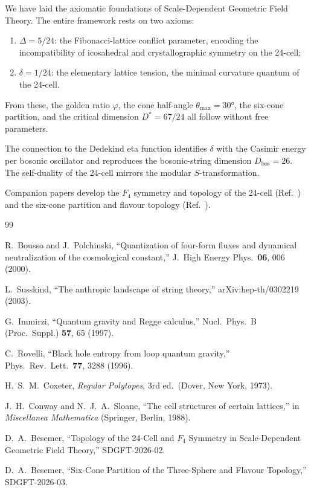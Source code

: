 \documentclass[amsmath,amssymb,aps,prd,twocolumn,superscriptaddress,nofootinbib]{revtex4-2}
\begin{document}
We have laid the axiomatic foundations of Scale-Dependent Geometric Field
Theory.  The entire framework rests on two axioms:
\begin{enumerate}
  \item $\Delta = 5/24$: the Fibonacci-lattice conflict parameter, encoding the
    incompatibility of icosahedral and crystallographic symmetry on the 24-cell;
  \item $\delta = 1/24$: the elementary lattice tension, the minimal curvature
    quantum of the 24-cell.
\end{enumerate}
From these, the golden ratio $\varphi$, the cone half-angle $\theta_{\max} =
30°$, the six-cone partition, and the critical dimension $D^* = 67/24$ all
follow without free parameters.

The connection to the Dedekind eta function identifies $\delta$ with the
Casimir energy per bosonic oscillator and reproduces the bosonic-string
dimension $D_{\text{bos}} = 26$.  The self-duality of the 24-cell mirrors the
modular $S$-transformation.

Companion papers develop the $F_4$ symmetry and topology of the 24-cell
(Ref.~\cite{Besemer2026_02}) and the six-cone partition and flavour topology
(Ref.~\cite{Besemer2026_03}).

\begin{thebibliography}{99}

R.~Bousso and J.~Polchinski,
``Quantization of four-form fluxes and dynamical neutralization of the
cosmological constant,''
J.\ High Energy Phys.\ \textbf{06}, 006 (2000).

L.~Susskind,
``The anthropic landscape of string theory,''
arXiv:hep-th/0302219 (2003).

G.~Immirzi,
``Quantum gravity and Regge calculus,''
Nucl.\ Phys.\ B (Proc.\ Suppl.) \textbf{57}, 65 (1997).

C.~Rovelli,
``Black hole entropy from loop quantum gravity,''
Phys.\ Rev.\ Lett.\ \textbf{77}, 3288 (1996).

H.~S.~M.~Coxeter,
\emph{Regular Polytopes}, 3rd ed.\ (Dover, New York, 1973).

J.~H.~Conway and N.~J.~A.~Sloane,
``The cell structures of certain lattices,''
in \emph{Miscellanea Mathematica} (Springer, Berlin, 1988).

D.~A.~Besemer,
``Topology of the 24-Cell and $F_4$ Symmetry in Scale-Dependent Geometric
Field Theory,'' SDGFT-2026-02.

D.~A.~Besemer,
``Six-Cone Partition of the Three-Sphere and Flavour Topology,''
SDGFT-2026-03.

\end{thebibliography}
\end{document}
